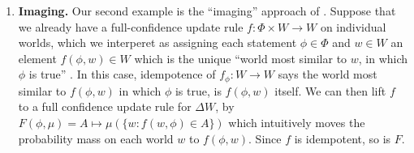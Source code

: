 \begin{enumerate}[wide, label=\textbf{\thesubsection.\arabic*}]
	\item
	\textbf{Imaging.}
	Our second example is the ``imaging''
	approach of \textcite{lewis1976probabilities}.
	Suppose that
 	we already have a full-confidence update rule
	$f : \Phi \times W \to W$ on individual worlds, which we interperet as assigning each statement $\phi \in \Phi$ and $w \in W$ an element $f(\phi, w) \in W$ which is the unique ``world most similar to $w$, in which $\phi$ is true'' \parencite{gardenfors1979imaging}.
	In this case, idempotence of $f_\phi: W \to W$
	says the world most similar to $f(\phi,w)$ in which $\phi$ is true, is $f(\phi,w)$ itself.
	We can then 
	lift $f$ to a full confidence update rule for $\Delta W$,
	by
	$%
    		F(\phi, \mu) 
    			= A \mapsto \mu(\{w : f(w, \phi) \in A\})
	$
	which intuitively moves the probability mass on each world $w$ to
	$f(\phi,w)$.	
	Since $f$ is idempotent, so is $F$.


\end{enumerate}
